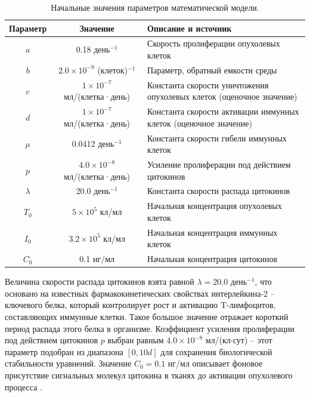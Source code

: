 \begin{table}[ht!]
  \centering
  \caption{Начальные значения параметров математической модели.}
  \label{tab:base_params}
  \begin{tabular}{|c|c|p{7cm}|}
    \hline
    Параметр & Значение & Описание и источник \\
    \hline
    $a$ & 0.18 день$^{-1}$ & Скорость пролиферации опухолевых клеток
    \cite{Kuznetsov1994} \\
    \hline
    $b$ & $2.0 \times 10^{-9}$ (клеток)$^{-1}$ & Параметр, обратный емкости среды
    \cite{Kuznetsov1994} \\
    \hline
    $c$ & $1 \times 10^{-7}$ мл/(клетка·день) & Константа скорости уничтожения
    опухолевых клеток (оценочное значение) \\
    \hline
    $d$ &  $1 \times 10^{-7}$ мл/(клетка·день) & Константа скорости активации
    иммунных клеток (оценочное значение) \\
    \hline
    $\mu$ & 0.0412 день$^{-1}$ & Константа скорости гибели иммунных клеток
    \cite{Kuznetsov1994} \\
    \hline
    $p$ & $4.0 \times 10^{-8}$ мл/(клетка·день) & Усиление пролиферации под
    действием цитокинов \\
    \hline
    $\lambda$ & 20.0 день$^{-1}$ & Константа скорости распада цитокинов
    \cite{cytokine_decay_rate} \\
    \hline
    $T_0$ & $5 \times 10^{5}$ кл/мл & Начальная концентрация опухолевых клеток
    \cite{Kuznetsov1994} \\
    \hline
    $I_0$ & $3.2 \times 10^{5}$ кл/мл & Начальная концентрация иммунных клеток
    \cite{Kuznetsov1994} \\
    \hline
    $C_0$ & 0.1 нг/мл & Начальная концентрация цитокинов \\
    \hline
  \end{tabular}
\end{table}

Величина скорости распада цитокинов взята равной $\lambda = 20.0$ день$^{-1}$,
что основано на известных фармакокинетических свойствах интерлейкина-2
\cite{il2_pharmacokinetics} -- ключевого белка, который контролирует
рост и активацию T-лимфоцитов, составляющих иммунные клетки. Такое
большое значение отражает короткий период распада этого белка в организме. Коэффициент
усиления пролиферации под действием цитокинов $p$ выбран равным $4.0
\times 10^{-8}$ мл/(кл$\cdot$сут) -- этот параметр подобран из диапазона
$[0,10d]$ для сохранения биологической стабильности уравнений.
Значение $C_0 = 0.1$ нг/мл описывает фоновое присутствие сигнальных молекул цитокина
в тканях до активации опухолевого процесса \cite{initial_cytokines}.

